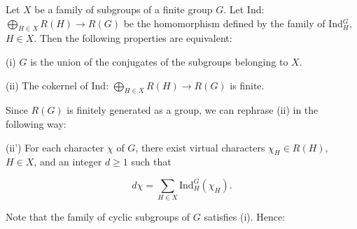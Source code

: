Let $X$ be a family of subgroups of a finite group $G$. Let Ind: $\bigoplus_{H \in X} R(H) \rightarrow R(G)$ be the homomorphism defined by the family of Ind$^G_H$, $H \in X$. Then the following properties are equivalent:

(i) $G$ is the union of the conjugates of the subgroups belonging to $X$.

(ii) The cokernel of Ind: $\bigoplus_{H \in X} R(H) \rightarrow R(G)$ is finite.

Since $R(G)$ is finitely generated as a group, we can rephrase (ii) in the following way:

(ii') For each character $\chi$ of $G$, there exist virtual characters $\chi_H \in R(H)$, $H \in X$, and an integer $d \geqslant 1$ such that

$$d\chi = \sum_{H \in X} \text{Ind}^G_H(\chi_H).$$

Note that the family of cyclic subgroups of $G$ satisfies (i). Hence:
